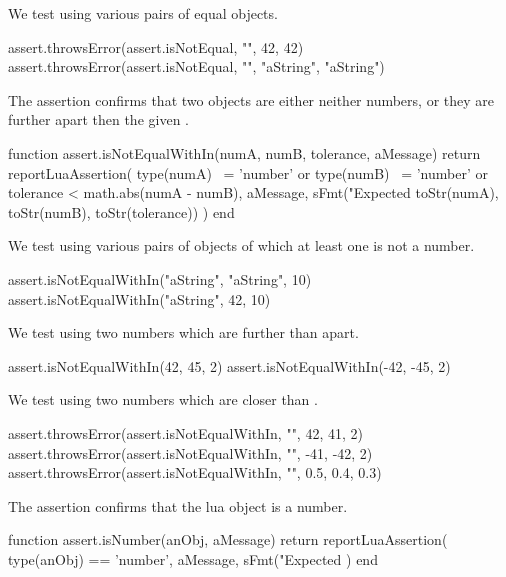 We test using various pairs of equal objects.

\startLuaTest
  assert.throwsError(assert.isNotEqual, "", 42, 42)
  assert.throwsError(assert.isNotEqual, "", "aString", "aString")
\stopLuaTest
\stopTestCase

\stopTestSuite


The  assertion confirms that two objects are 
either neither numbers, or they are further apart then the given 
. 

\startLuaCode
function assert.isNotEqualWithIn(numA, numB, tolerance, aMessage)
  return reportLuaAssertion(
    type(numA) ~= 'number' or type(numB) ~= 'number'
    or tolerance < math.abs(numA - numB), 
    aMessage,
    sFmt("Expected %
      toStr(numA), toStr(numB), toStr(tolerance))
  )
end
\stopLuaCode


We test using various pairs of objects of which at least one is not a 
number. 

\startLuaTest
  assert.isNotEqualWithIn("aString", "aString", 10)
  assert.isNotEqualWithIn("aString", 42, 10)
\stopLuaTest
\stopTestCase


We test using two numbers which are further than  apart. 

\startLuaTest
  assert.isNotEqualWithIn(42, 45, 2)
  assert.isNotEqualWithIn(-42, -45, 2)
\stopLuaTest
\stopTestCase


We test using two numbers which are closer than . 

\startLuaTest
  assert.throwsError(assert.isNotEqualWithIn, "", 42, 41, 2)
  assert.throwsError(assert.isNotEqualWithIn, "", -41, -42, 2)
  assert.throwsError(assert.isNotEqualWithIn, "", 0.5, 0.4, 0.3)
\stopLuaTest
\stopTestCase

\stopTestSuite


The  assertion confirms that the lua object is a 
number. 

\startLuaCode
function assert.isNumber(anObj, aMessage)
  return reportLuaAssertion(
    type(anObj) == 'number',
    aMessage,
    sFmt("Expected %
  )
end
\stopLuaCode

